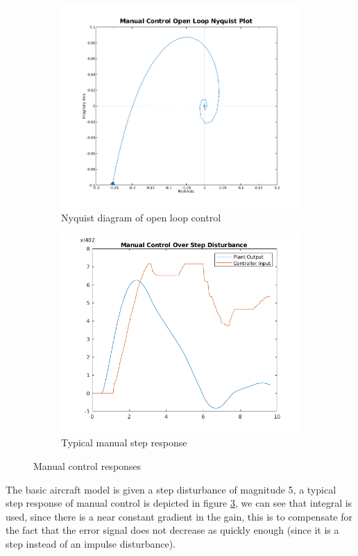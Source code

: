\documentclass{article}
\begin{document}
\begin{figure}
\centering
\begin{subfigure}{.5\textwidth}
  \centering
  \includegraphics[width=0.8\linewidth]{nyquist_manual.png}
	\caption{Nyquist diagram of open loop control}
	\label{fig:nyquist_manual}
\end{subfigure}%
\begin{subfigure}{.5\textwidth}
  \centering
  \includegraphics[width=0.8\linewidth]{1_3_Plant_Bode_Manual_Control_Step.png}
  \caption{Typical manual step response}
  \label{fig:step_manual}
\end{subfigure}
	\caption{Manual control responses}
\end{figure}

The basic aircraft model is given a step disturbance of magnitude 5, a typical step response of manual control is depicted in figure \ref{fig:step_manual}, we can see that integral is used, since there is a near constant gradient in the gain, this is to compensate for the fact that the error signal does not decrease as quickly enough (since it is a step instead of an impulse disturbance).
\end{document}

